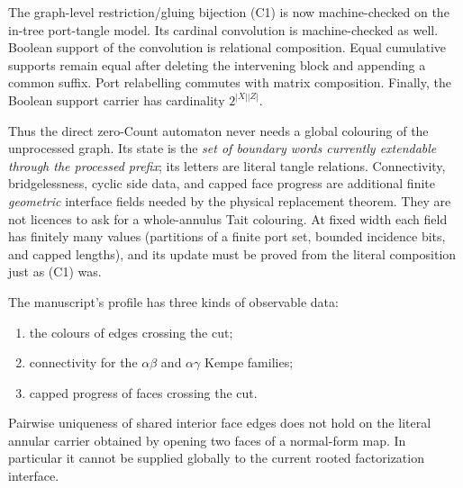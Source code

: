 \begin{remark}
\label{rem:bounded-interface-count-lean}
The graph-level restriction/gluing bijection (C1) is now machine-checked on
the in-tree port-tangle model.
Its cardinal convolution is machine-checked as well.
Boolean support of the convolution is relational composition.
Equal cumulative supports remain equal after deleting the intervening block
and appending a common suffix.
Port relabelling commutes with matrix composition.
Finally, the Boolean support carrier has cardinality
\(2^{|X||Z|}\).
\end{remark}

Thus the direct zero-Count automaton never needs a global colouring of the
unprocessed graph.  Its state is the \emph{set of boundary words currently
extendable through the processed prefix}; its letters are literal tangle
relations.  Connectivity, bridgelessness, cyclic side data, and capped face
progress are additional finite \emph{geometric} interface fields needed by
the physical replacement theorem.  They are not licences to ask for a
whole-annulus Tait colouring.  At fixed width each field has finitely many
values (partitions of a finite port set, bounded incidence bits, and capped
lengths), and its update must be proved from the literal composition just as
(C1) was.

The manuscript's profile has three kinds of observable data:
\begin{enumerate}
\item the colours of edges crossing the cut;
\item connectivity for the $\alpha\beta$ and $\alpha\gamma$ Kempe families;
\item capped progress of faces crossing the cut.
\end{enumerate}

\begin{proposition}
\label{prop:opened-global-face-uniqueness-refuted}
Pairwise uniqueness of shared interior face edges does not hold on the
literal annular carrier obtained by opening two faces of a normal-form map.
In particular it cannot be supplied globally to the current rooted
factorization interface.
\end{proposition}

